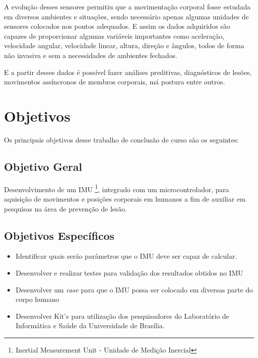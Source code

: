 A evolução desses sensores permitiu que a movimentação corporal fosse estudada em diversos ambientes e situações, sendo necessário apenas algumas unidades de sensores colocados nos pontos adequados. E assim os dados adquiridos são capazes de proporcionar algumas variáveis importantes como aceleração, velocidade angular, velocidade linear, altura, direção e ângulos, todos de forma não invasiva
e sem a necessidades de ambientes fechados\cite{chang2016}.

E a partir desses dados é possível fazer análises preditivas, diagnósticos de lesões, movimentos assíncronos de membros corporais, má postura entre outros.



\section{Objetivos}

Os principais objetivos desse trabalho de conclusão de curso são os seguintes:

\subsection{Objetivo Geral}
	
Desenvolvimento de um IMU \footnote{Inertial Measurement Unit - Unidade de Medição Inercial}, integrado com um microcontrolador, para aquisição de movimentos e posições corporais em humanos a fim de auxiliar em pesquisas na área de prevenção de lesão.

\subsection {Objetivos Específicos} 
 \begin{itemize} 
		\item Identificar quais serão parâmetros que o IMU deve ser capaz de calcular. 
		
		\item Desenvolver e realizar testes para validação dos resultados obtidos no IMU
		
		\item Desenvolver um \textit{case} para que o IMU possa ser colocado em diversas parte do corpo humano
		
		\item Desenvolver Kit's para utilização dos pesquisadores do Laboratório de Informática e Saúde da Universidade de Brasília.
		
		
	\end{itemize}
